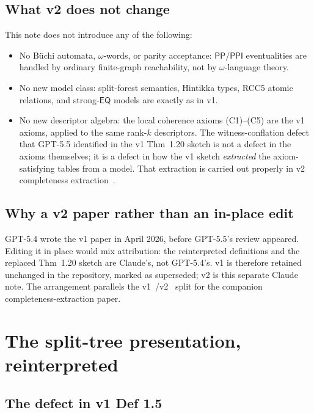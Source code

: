 \documentclass[11pt]{article}
\theoremstyle{definition}
\theoremstyle{remark}
\newcommand{\PP}{\mathsf{PP}}
\newcommand{\PPI}{\mathsf{PPI}}
\newcommand{\EQ}{\mathsf{EQ}}
\begin{document}
\subsection{What v2 does not change}

This note does not introduce any of the following:
\begin{itemize}
\item No B\"uchi automata, $\omega$-words, or parity acceptance:
  $\PP/\PPI$ eventualities are handled by ordinary finite-graph
  reachability, not by $\omega$-language theory.
\item No new model class: split-forest semantics, Hintikka types,
  RCC5 atomic relations, and strong-$\EQ$ models are exactly as
  in v1.
\item No new descriptor algebra: the local coherence axioms
  (C1)--(C5) are the v1 axioms, applied to the same rank-$k$
  descriptors. The witness-conflation defect that GPT-5.5
  identified in the v1 Thm~1.20 sketch is not a defect in the
  axioms themselves; it is a defect in how the v1 sketch
  \emph{extracted} the axiom-satisfying tables from a model. That
  extraction is carried out properly in v2 completeness
  extraction~\cite[\S 6, \S 9]{CompletenessV2}.
\end{itemize}

\subsection{Why a v2 paper rather than an in-place edit}

GPT-5.4 wrote the v1 paper in April 2026, before GPT-5.5's review
appeared. Editing it in place would mix attribution: the
reinterpreted definitions and the replaced Thm~1.20 sketch are
Claude's, not GPT-5.4's. v1 is therefore retained unchanged in
the repository, marked as superseded; v2 is this separate Claude
note. The arrangement parallels the
v1~\cite{CompletenessV1}/v2~\cite{CompletenessV2} split for the
companion completeness-extraction paper.

\section{The split-tree presentation, reinterpreted}
\label{sec:split-tree}

\subsection{The defect in v1 Def 1.5}
\end{document}
